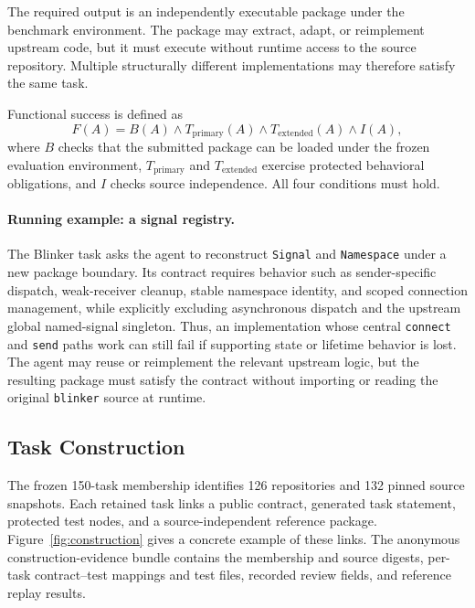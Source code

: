\documentclass[acmsmall,screen,review,anonymous]{acmart}
\begin{document}
The required output is an independently executable package under the benchmark
environment. The package may extract, adapt, or reimplement upstream code, but
it must execute without runtime access to the source repository. Multiple
structurally different implementations may therefore satisfy the same task.

Functional success is defined as
\begin{equation}
  F(A)=B(A)\land T_{\mathrm{primary}}(A)
       \land T_{\mathrm{extended}}(A)\land I(A),
  \label{eq:functional}
\end{equation}
where $B$ checks that the submitted package can be loaded under the frozen
evaluation environment, $T_{\mathrm{primary}}$ and
$T_{\mathrm{extended}}$ exercise protected behavioral obligations, and $I$
checks source independence. All four conditions must hold.

\paragraph{Running example: a signal registry.}
The Blinker task asks the agent to reconstruct \texttt{Signal} and
\texttt{Namespace} under a new package boundary. Its contract requires behavior
such as sender-specific dispatch, weak-receiver cleanup, stable namespace
identity, and scoped connection management, while explicitly excluding
asynchronous dispatch and the upstream global named-signal singleton. Thus, an
implementation whose central \texttt{connect} and \texttt{send} paths work can
still fail if supporting state or lifetime behavior is lost. The agent may reuse
or reimplement the relevant upstream logic, but the resulting package must
satisfy the contract without importing or reading the original \texttt{blinker}
source at runtime.

\subsection{Task Construction}
\label{sec:construction}

The frozen 150-task membership identifies 126 repositories and 132 pinned
source snapshots. Each retained task links a public contract, generated task
statement, protected test nodes, and a source-independent reference package.
Figure~\ref{fig:construction} gives a concrete example of these links. The
anonymous construction-evidence bundle contains the membership and source
digests, per-task contract--test mappings and test files, recorded review
fields, and reference replay results.
\end{document}
